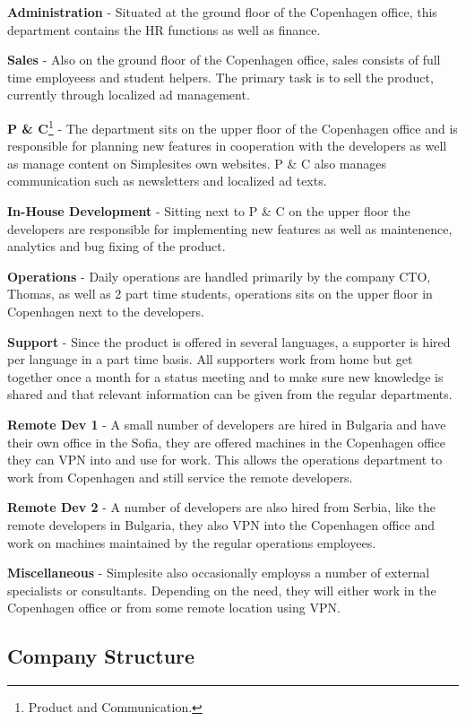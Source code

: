 \begin{itemize*}
    \item \textbf{Administration} - Situated at the ground floor of the
          Copenhagen office, this department contains the HR functions as well as
          finance.

    \item \textbf{Sales} - Also on the ground floor of the Copenhagen office,
          sales consists of full time employeess and student helpers. The
          primary task is to sell the product, currently through localized ad
          management.

    \item \textbf{P \& C}\footnote{Product and Communication.} - The department
          sits on the upper floor of the Copenhagen office and is responsible
          for planning new features in cooperation with the developers as well
          as manage content on Simplesites own websites. P \& C also manages
          communication such as newsletters and localized ad texts.

    \item \textbf{In-House Development} - Sitting next to P \& C on the upper
          floor the developers are responsible for implementing new features as
          well as maintenence, analytics and bug fixing of the product.

    \item \textbf{Operations} - Daily operations are handled primarily by the
          company CTO, Thomas, as well as 2 part time students, operations sits
          on the upper floor in Copenhagen next to the developers.

    \item \textbf{Support} - Since the product is offered in several languages,
          a supporter is hired per language in a part time basis. All supporters
          work from home but get together once a month for a status meeting and
          to make sure new knowledge is shared and that relevant information can
          be given from the regular departments.

    \item \textbf{Remote Dev 1} - A small number of developers are hired in
          Bulgaria and have their own office in the Sofia, they are offered
          machines in the Copenhagen office they can VPN into and use for work.
          This allows the operations department to work from Copenhagen and
          still service the remote developers.

    \item \textbf{Remote Dev 2} - A number of developers are also hired from
          Serbia, like the remote developers in Bulgaria, they also VPN into the
          Copenhagen office and work on machines maintained by the regular
          operations employees.

    \item \textbf{Miscellaneous} - Simplesite also occasionally employss a
          number of external specialists or consultants. Depending on the need,
          they will either work in the Copenhagen office or from some remote
          location using VPN.
\end{itemize*}


\subsection{Company Structure}
